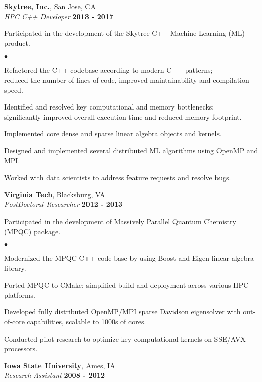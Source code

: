 \documentclass[overlap,line]{cv}
\newenvironment{list2}{
  \begin{list}{$\bullet$}{%
      \setlength{\itemsep}{0in}
      \setlength{\parsep}{0in} \setlength{\parskip}{0in}
      \setlength{\topsep}{0in} \setlength{\partopsep}{0in} 
      \setlength{\leftmargin}{0.2in}}}{\end{list}}
\begin{document}
\begin{resume}
\newpage

{\bf Skytree, Inc.}, San Jose, CA \\
{\it HPC C++ Developer} \hfill {\bf 2013 - 2017}

Participated in the development of the Skytree C++ Machine Learning (ML) product.
\vspace{.05in}
\begin{list2}
\item Refactored the C++ codebase according to modern C++ patterns; \\
  reduced the number of lines of code, improved maintainability and compilation speed.
\item Identified and resolved key computational and memory bottlenecks; \\
  significantly improved overall execution time and reduced memory footprint.
\item Implemented core dense and sparse linear algebra objects and kernels.
\item Designed and implemented several distributed ML algorithms using OpenMP and MPI.
\item Worked with data scientists to address feature requests and resolve bugs.
\end{list2}

{\bf Virginia Tech}, Blacksburg, VA \\
{\it PostDoctoral Researcher} \hfill {\bf 2012 - 2013}

Participated in the development of Massively Parallel Quantum Chemistry (MPQC) package.
\vspace{.05in}
\begin{list2}
\item Modernized the MPQC C++ code base by using Boost and Eigen linear algebra library.
\item Ported MPQC to CMake; simplified build and deployment across various HPC platforms.
\item Developed fully distributed OpenMP/MPI sparse Davidson eigensolver
  with out-of-core capabilities, scalable to 1000s of cores.
\item Conducted pilot research to optimize key computational kernels on SSE/AVX processors.
\end{list2}


{\bf Iowa State University}, Ames, IA \\
{\it Research Assistant} \hfill {\bf 2008 - 2012}


\end{resume}
\end{document}
